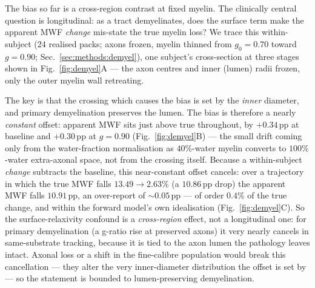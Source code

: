 The bias so far is a cross-region contrast at fixed myelin. The clinically central
question is longitudinal: as a tract demyelinates, does the surface term make the apparent
MWF \emph{change} mis-state the true myelin loss? We trace this within-subject (24 realised
packs; axons frozen, myelin thinned from $g_0=0.70$ toward $g=0.90$;
Sec.~\ref{sec:methods:demyel}), one subject's cross-section at three stages shown in
Fig.~\ref{fig:demyel}A --- the axon centres and inner (lumen) radii frozen, only the outer
myelin wall retreating.

The key is that the crossing which causes the bias is set by the \emph{inner} diameter, and
primary demyelination preserves the lumen. The bias is therefore a nearly \emph{constant}
offset: apparent MWF sits just above true throughout, by $+0.34$\,pp at baseline and
$+0.30$\,pp at $g=0.90$ (Fig.~\ref{fig:demyel}B) --- the small drift coming only from the
water-fraction normalisation as $40\%$-water myelin converts to $100\%$-water extra-axonal
space, not from the crossing itself. Because a within-subject \emph{change} subtracts the
baseline, this near-constant offset cancels: over a trajectory in which the true MWF falls
$13.49\!\to\!2.63\%$ (a $10.86$\,pp drop) the apparent MWF falls $10.91$\,pp, an
over-report of ${\sim}0.05$\,pp --- of order $0.4\%$ of the true change, and within the forward
model's own idealisation (Fig.~\ref{fig:demyel}C). So the
surface-relaxivity confound is a \emph{cross-region} effect, not a longitudinal one: for
primary demyelination (a g-ratio rise at preserved axons) it very nearly cancels in
same-substrate tracking, because it is tied to the axon lumen the pathology leaves intact.
Axonal loss or a shift in the fine-calibre population would break this cancellation ---
they alter the very inner-diameter distribution the offset is set by --- so the statement is
bounded to lumen-preserving demyelination.

